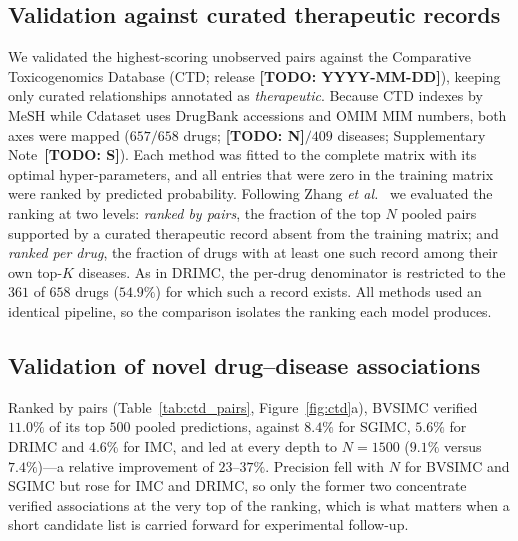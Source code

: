\providecommand{\TODO}[1]{\textbf{[TODO: #1]}}

\subsection{Validation against curated therapeutic records}
\label{sec:ctd-methods}

We validated the highest-scoring unobserved pairs against the Comparative
Toxicogenomics Database (CTD; release \TODO{YYYY-MM-DD}), keeping only curated
relationships annotated as \emph{therapeutic}. Because CTD indexes by MeSH while
Cdataset uses DrugBank accessions and OMIM MIM numbers, both axes were mapped
($657/658$ drugs; \TODO{N}$/409$ diseases; Supplementary Note~\TODO{S}). Each
method was fitted to the complete matrix with its optimal hyper-parameters, and
all entries that were zero in the training matrix were ranked by predicted
probability. Following Zhang \emph{et al.}~\cite{drimc} we evaluated the ranking
at two levels: \emph{ranked by pairs}, the fraction of the top $N$ pooled pairs
supported by a curated therapeutic record absent from the training matrix; and
\emph{ranked per drug}, the fraction of drugs with at least one such record among
their own top-$K$ diseases. As in DRIMC, the per-drug denominator is restricted
to the $361$ of $658$ drugs ($54.9\%$) for which such a record exists. All
methods used an identical pipeline, so the comparison isolates the ranking each
model produces.

\subsection{Validation of novel drug--disease associations}
\label{sec:ctd-results}

Ranked by pairs (Table~\ref{tab:ctd_pairs}, Figure~\ref{fig:ctd}a), BVSIMC
verified $11.0\%$ of its top $500$ pooled predictions, against $8.4\%$ for SGIMC,
$5.6\%$ for DRIMC and $4.6\%$ for IMC, and led at every depth to $N=1500$
($9.1\%$ versus $7.4\%$)---a relative improvement of $23$--$37\%$. Precision fell
with $N$ for BVSIMC and SGIMC but rose for IMC and DRIMC, so only the former two
concentrate verified associations at the very top of the ranking, which is what
matters when a short candidate list is carried forward for experimental
follow-up.

